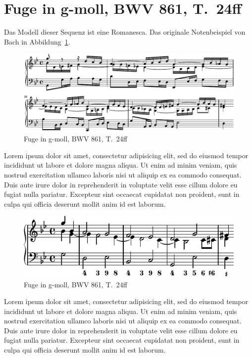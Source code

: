 \section{Fuge in g-moll, BWV 861, T.~24ff}

Das Modell dieser Sequenz ist eine Romanesca. Das originale Notenbeispiel von Bach in Abbildung~\ref{fig:bwv681-original}.

\begin{figure}[htbp]
	\centering
	\includegraphics{lilypond/g-moll/render/original}
	\caption{Fuge in g-moll, BWV 861, T.~24ff}
	\label{fig:bwv681-original}
\end{figure}

Lorem ipsum dolor sit amet, consectetur adipisicing elit, sed do eiusmod tempor incididunt ut labore et dolore magna aliqua. Ut enim ad minim veniam, quis nostrud exercitation ullamco laboris nisi ut aliquip ex ea commodo consequat. Duis aute irure dolor in reprehenderit in voluptate velit esse cillum dolore eu fugiat nulla pariatur. Excepteur sint occaecat cupidatat non proident, sunt in culpa qui officia deserunt mollit anim id est laborum.

\begin{figure}[htbp]
	\centering
	\includegraphics{lilypond/g-moll/render/romanesca-standard}
	\caption{Fuge in g-moll, BWV 861, T.~24ff}
	\label{fig:bwv681-standard}
\end{figure}

Lorem ipsum dolor sit amet, consectetur adipisicing elit, sed do eiusmod tempor incididunt ut labore et dolore magna aliqua. Ut enim ad minim veniam, quis nostrud exercitation ullamco laboris nisi ut aliquip ex ea commodo consequat. Duis aute irure dolor in reprehenderit in voluptate velit esse cillum dolore eu fugiat nulla pariatur. Excepteur sint occaecat cupidatat non proident, sunt in culpa qui officia deserunt mollit anim id est laborum.

